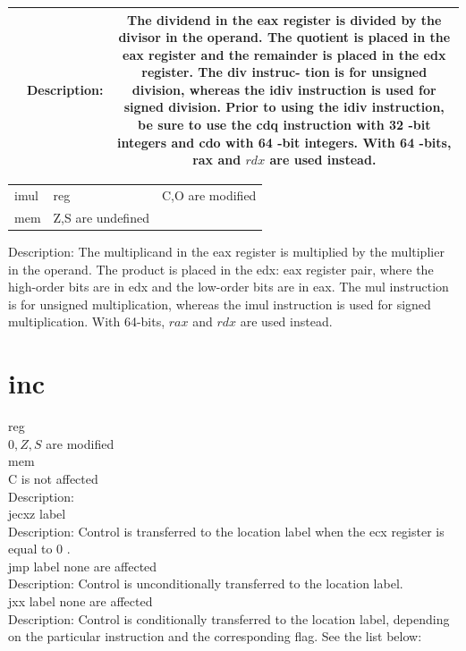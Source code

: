 \documentclass[10pt]{book}
\begin{document}
\begin{center}
\begin{center}
\begin{center}
\begin{center}
\begin{center}
\begin{center}
\begin{tabular}{|c|c|c|}
\hline
 & Description: & The dividend in the eax register is divided by the divisor in the operand. The quotient is placed in the eax register and the remainder is placed in the edx register. The div instruc- tion is for unsigned division, whereas the idiv instruction is used for signed division. Prior to using the idiv instruction, be sure to use the cdq instruction with 32 -bit integers and cdo with 64 -bit integers. With 64 -bits, rax and $r d x$ are used instead. \\
\hline
\end{tabular}
\end{center}

\begin{center}
\begin{tabular}{lll}
imul & reg & C,O are modified \\
mem & Z,S are undefined &  \\
\end{tabular}
\end{center}

Description: The multiplicand in the eax register is multiplied by the multiplier in the operand. The product is placed in the edx: eax register pair, where the high-order bits are in edx and the low-order bits are in eax. The mul instruction is for unsigned multiplication, whereas the imul instruction is used for signed multiplication. With 64-bits, $r a x$ and $r d x$ are used instead.

\section*{inc}
reg\\
$0, Z, S$ are modified\\
mem\\
C is not affected\\
Description:\\
jecxz label\\
Description: Control is transferred to the location label when the ecx register is equal to 0 .\\
jmp label none are affected\\
Description: Control is unconditionally transferred to the location label.\\
jxx label none are affected\\
Description: Control is conditionally transferred to the location label, depending on the particular instruction and the corresponding flag. See the list below:


\end{center}
\end{center}
\end{center}
\end{center}
\end{center}
\end{document}
